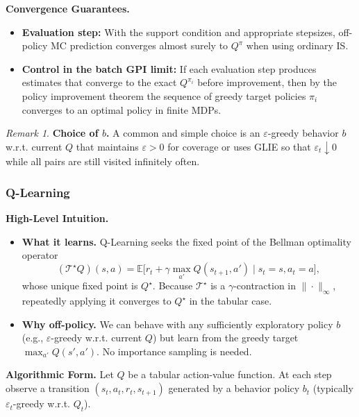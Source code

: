 \documentclass[
]{book}
\theoremstyle{definition}
\theoremstyle{definition}
\theoremstyle{definition}
\theoremstyle{definition}
\theoremstyle{remark}
\newtheorem*{remark}{Remark}
\begin{document}
\textbf{Convergence Guarantees.}

\begin{itemize}
\item
  \textbf{Evaluation step:} With the support condition and appropriate stepsizes, off-policy MC prediction converges almost surely to \(Q^\pi\) when using ordinary IS.
\item
  \textbf{Control in the batch GPI limit:} If each evaluation step produces estimates that converge to the exact \(Q^{\pi_i}\) before improvement, then by the policy improvement theorem the sequence of greedy target policies \(\pi_i\) converges to an optimal policy in finite MDPs.
\end{itemize}

\begin{remark}
\textbf{Choice of \(b\).} A common and simple choice is an \(\varepsilon\)-greedy behavior \(b\) w.r.t. current \(Q\) that maintains \(\varepsilon>0\) for coverage or uses GLIE so that \(\varepsilon_t \downarrow 0\) while all pairs are still visited infinitely often.
\end{remark}

\subsubsection{Q-Learning}\label{q-learning}

\textbf{High-Level Intuition.}

\begin{itemize}
\item
  \textbf{What it learns.} Q-Learning seeks the fixed point of the Bellman optimality operator
  \[
  (\mathcal T^\star Q)(s,a) = \mathbb E\big[ r_{t} + \gamma \max_{a'} Q(s_{t+1}, a') \mid s_t=s, a_t=a \big],
  \]
  whose unique fixed point is \(Q^\star\). Because \(\mathcal T^\star\) is a \(\gamma\)-contraction in \(\|\cdot\|_\infty\), repeatedly applying it converges to \(Q^\star\) in the tabular case.
\item
  \textbf{Why off-policy.} We can behave with any sufficiently exploratory policy \(b\) (e.g., \(\varepsilon\)-greedy w.r.t. current \(Q\)) but learn from the greedy target \(\max_{a'} Q(s',a')\). No importance sampling is needed.
\end{itemize}

\textbf{Algorithmic Form.} Let \(Q\) be a tabular action-value function. At each step observe a transition \((s_t, a_t, r_{t}, s_{t+1})\) generated by a behavior policy \(b_t\) (typically \(\varepsilon_t\)-greedy w.r.t. \(Q_t\)).
\end{document}
